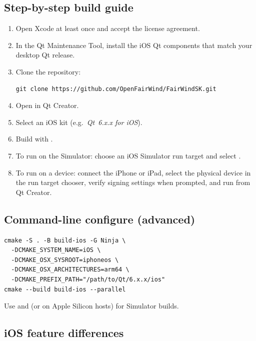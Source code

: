 \subsection{Step-by-step build guide}

\begin{enumerate}
  \item Open Xcode at least once and accept the license agreement.
  \item In the Qt Maintenance Tool, install the iOS Qt components
        that match your desktop Qt release.
  \item Clone the repository:
\begin{lstlisting}
git clone https://github.com/OpenFairWind/FairWindSK.git
\end{lstlisting}
  \item Open  in Qt Creator.
  \item Select an iOS kit (e.g.\ \textit{Qt~6.x.x for iOS}).
  \item Build with .
  \item To run on the Simulator: choose an iOS Simulator run target
        and select .
  \item To run on a device: connect the iPhone or iPad, select the
        physical device in the run target chooser, verify signing settings
        when prompted, and run from Qt Creator.
\end{enumerate}

\subsection{Command-line configure (advanced)}

\begin{lstlisting}
cmake -S . -B build-ios -G Ninja \
  -DCMAKE_SYSTEM_NAME=iOS \
  -DCMAKE_OSX_SYSROOT=iphoneos \
  -DCMAKE_OSX_ARCHITECTURES=arm64 \
  -DCMAKE_PREFIX_PATH="/path/to/Qt/6.x.x/ios"
cmake --build build-ios --parallel
\end{lstlisting}

Use \code{iphonesimulator} and \code{x86\_64} (or  on
Apple Silicon hosts) for Simulator builds.

\subsection{iOS feature differences}


